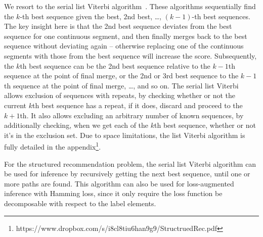 We resort to the serial list Viterbi algorithm~\cite{nilsson2001sequentially}.
These algorithms sequentially find the $k$-th best sequence given the best, $2$nd best, \dots, $(k-1)$-th best sequences.
The key insight here is that the 2nd best sequence deviates from the best sequence
for one continuous segment, and then finally merges back to the best sequence without deviating again
-- otherwise replacing one of the continuous segments with those from the best sequence will increase the score.
Subsequently, the $k$th best sequence can be the 2nd best sequence relative to the $k-1$th sequence
at the point of final merge, or the 2nd or 3rd best sequence to the $k-1$th sequence at the point of final merge, \ldots, and so on.
The serial list Viterbi allows exclusion of sequences with repeats, by checking whether or not the current $k$th best sequence has a repeat, if it does, discard and proceed to the $k+1$th. It also allows excluding an arbitrary number of known sequences, by additionally checking, when we get each of the $k$th best sequence, whether or not it's in the exclusion set.
Due to space limitations, the list Viterbi algorithm is fully detailed in the appendix\footnote{https://www.dropbox.com/s/i8cl8tiu6han9g9/StructruedRec.pdf}.

For the structured recommendation problem, the serial list Viterbi algorithm can be used for inference
by recursively getting the next best sequence, until one or more paths are found.
This algorithm can also be used for loss-augmented inference with Hamming loss,
since it only require the loss function be decomposable with respect to the label elements.

